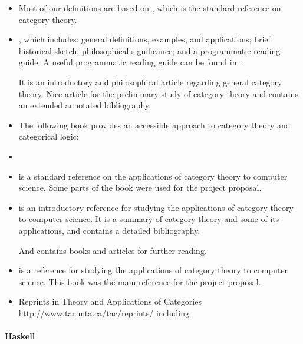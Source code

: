 \begin{itemize}
\item
  Most of our definitions are based on \parencite{maclane-1998}, which
  is the standard reference on category theory.

\item
  \parencite{marquis-2013}, which includes: general definitions,
  examples, and applications; brief historical sketch; philosophical
  significance; and a programmatic reading guide. A useful
  programmatic reading guide can be found in
  \parencite[48--56]{marquis-2013}.

  It is an introductory and philosophical article regarding general
  category theory. Nice article for the preliminary study of category
  theory and contains an extended annotated bibliography.

\item
  The following book provides an accessible approach to category
  theory and categorical logic: \parencite{awodey-2010}

\item
  \parencites{eilenberg-maclane-1942}{eilenberg-maclane-1945}

\item
  \parencite{bird-demoor-1997} is a standard reference on the
  applications of category theory to computer science. Some parts of
  the book were used for the project proposal.

\item
  \parencite{pierce-1991} is an introductory reference for studying
  the applications of category theory to computer science. It is a
  summary of category theory and some of its applications, and
  contains a detailed bibliography.

  And \parencite[§ 4]{pierce-1991} contains books and articles for
  further reading.

\item
  \parencite{poigne-1992} is a reference for studying the applications
  of category theory to computer science. This book was the main
  reference for the project proposal.

\item
  Reprints in Theory and Applications of Categories
  \url{http://www.tac.mta.ca/tac/reprints/} including
  \parencites{adamek-et-al-2006}{barr-wells-2005}{barr-wells-2012}

\end{itemize}

\paragraph{Haskell}

